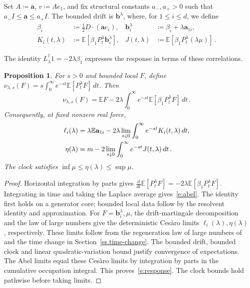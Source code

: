 \documentclass[11pt]{amsart}
\newtheorem{proposition}{Proposition}[section]
\theoremstyle{definition}
\theoremstyle{remark}
\numberwithin{equation}{section}
\newcommand{\E}{\mathbb E}
\renewcommand{\a}{\mathbf a}
\renewcommand{\b}{\mathbf b}
\newcommand{\ahom}{\overline{\mathbf a}}
\newcommand{\dd}{\,d}
\begin{document}
Set $A\coloneqq\ahom$, $v\coloneqq Ae_1$, and fix structural constants $a_-,a_+>0$ such that $a_-I\leq\a\leq a_+I$. The bounded drift is $\b^\lambda$, where, for $1\leq i\leq d$, we define
\begin{equation}\label{e:correlations}
 \begin{aligned}
 \beta_i&\coloneqq\frac12D\cdot(\a e_i),&\b_i^\lambda&\coloneqq\beta_i+\lambda\a_{1i},\\
 K_i(t,\lambda)&\coloneqq\E[\beta_1P_t^\lambda \b_i^\lambda],&
 J(t,\lambda)&\coloneqq\E[\beta_1P_t^\lambda(\lambda\mu)]\, .
 \end{aligned}
\end{equation}

The identity $L_\lambda^\dagger1=-2\lambda\beta_1$ expresses the response in terms of these correlations.

\begin{proposition}\label{p:response}
For $s>0$ and bounded local $F$, define $\nu_{\lambda,s}(F)=s\int_0^\infty e^{-st}\E[P_t^\lambda F]\dd t$. Then
\begin{equation}\label{e:abel}
 \nu_{\lambda,s}(F)
 =\E F-2\lambda\int_0^\infty e^{-st}
                         \E[\beta_1P_t^\lambda F]\dd t\, .
\end{equation}
Consequently, at fixed nonzero real force,
\begin{align}\label{e:response}
 \ell_i(\lambda)
 &=\lambda\E \a_{1i}-2\lambda\lim_{s\downarrow0}
                        \int_0^\infty e^{-st}K_i(t,\lambda)\dd t,\notag\\
 \eta(\lambda)
 &=m-2\lim_{s\downarrow0}\int_0^\infty e^{-st}J(t,\lambda)\dd t\, .
\end{align}
The clock satisfies $\inf\mu\leq\eta(\lambda)\leq\sup\mu$.
\end{proposition}

\begin{proof}
Horizontal integration by parts gives $\frac{d}{dt}\E[P_t^\lambda F]=-2\lambda\E[\beta_1P_t^\lambda F]$. Integrating in time and taking the Laplace average gives~\eqref{e:abel}. The identity first holds on a generator core; bounded local data follow by the resolvent identity and approximation. For $F=\b_i^\lambda,\mu$, the drift-martingale decomposition and the law of large numbers give the deterministic Ces\`aro limits $\ell_i(\lambda),\eta(\lambda)$, respectively. These limits follow from the regeneration law of large numbers of~\citet[Proposition~5.9]{Einstein2012gantert} and the time change in Section~\ref{ss.time-change}. The bounded drift, bounded clock and linear quadratic-variation bound justify convergence of expectations. The Abel limits equal these Ces\`aro limits by integration by parts in the cumulative occupation integral. This proves~\eqref{e:response}. The clock bounds hold pathwise before taking limits.
\end{proof}
\end{document}
